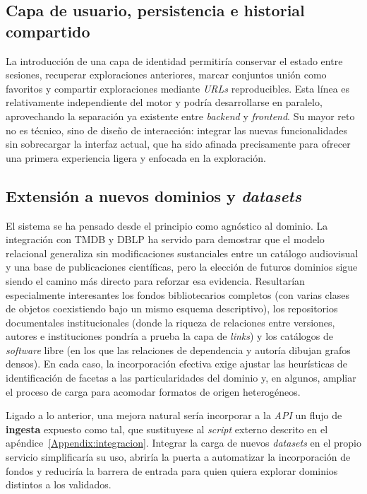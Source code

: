 \subsection{Capa de usuario, persistencia e historial compartido}

La introducción de una capa de identidad permitiría conservar el estado entre sesiones, recuperar
exploraciones anteriores, marcar conjuntos unión como favoritos y compartir exploraciones mediante
\textit{URLs} reproducibles. Esta línea es relativamente independiente del motor y podría
desarrollarse en paralelo, aprovechando la separación ya existente entre \textit{backend} y
\textit{frontend}. Su mayor reto no es técnico, sino de diseño de interacción: integrar las
nuevas funcionalidades sin sobrecargar la interfaz actual, que ha sido afinada precisamente para
ofrecer una primera experiencia ligera y enfocada en la exploración.

\subsection{Extensión a nuevos dominios y \textit{datasets}}

El sistema se ha pensado desde el principio como agnóstico al dominio. La integración con TMDB
y DBLP ha servido para demostrar que el modelo relacional generaliza sin modificaciones
sustanciales entre un catálogo audiovisual y una base de publicaciones científicas, pero la
elección de futuros dominios sigue siendo el camino más directo para reforzar esa evidencia.
Resultarían especialmente interesantes los fondos bibliotecarios completos (con varias clases
de objetos coexistiendo bajo un mismo esquema descriptivo), los repositorios documentales
institucionales (donde la riqueza de relaciones entre versiones, autores e instituciones pondría
a prueba la capa de \textit{links}) y los catálogos de \textit{software} libre (en los que las relaciones
de dependencia y autoría dibujan grafos densos). En cada caso, la incorporación efectiva exige
ajustar las heurísticas de identificación de facetas a las particularidades del dominio y, en
algunos, ampliar el proceso de carga para acomodar formatos de origen heterogéneos.

Ligado a lo anterior, una mejora natural sería incorporar a la \textit{API} un flujo de
\textbf{ingesta} expuesto como tal, que sustituyese al \textit{script} externo descrito en el
apéndice~\ref{Appendix:integracion}. Integrar la carga de nuevos \textit{datasets} en el propio
servicio simplificaría su uso, abriría la puerta a automatizar la incorporación de fondos y
reduciría la barrera de entrada para quien quiera explorar dominios distintos a los validados.

